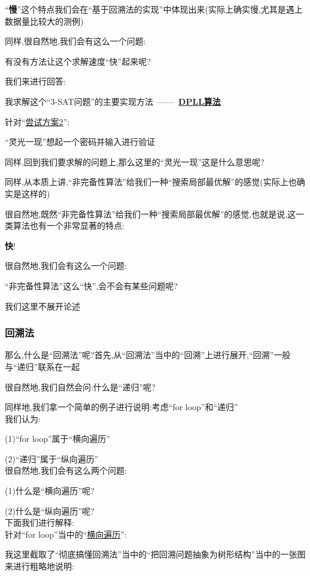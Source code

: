         \par
        ``\textbf{慢}''这个特点我们会在``基于回溯法的实现''中体现出来(实际上确实慢,尤其是遇上数据量比较大的测例)\par
        同样,很自然地,我们会有这么一个问题:\\
        \begin{center}
            有没有方法让这个求解速度``快''起来呢?
        \end{center}
        我们来进行回答:\\
        \begin{center}
            我求解这个``3-SAT问题''的主要实现方法\ ——\ \underline{\textbf{DPLL算法}}
        \end{center}
        针对``\underline{尝试方案2}'':\par
            ``灵光一现''想起一个密码并输入进行验证\par
            同样,回到我们要求解的问题上,那么这里的``灵光一现''这是什么意思呢?\par
            同样,从本质上讲,``非完备性算法''给我们一种``搜索局部最优解''的感觉(实际上也确实是这样的)\par
            很自然地,既然``非完备性算法''给我们一种``搜索局部最优解''的感觉,也就是说,这一类算法也有一个非常显著的特点:\\
        \begin{center}
            \textbf{快}!
        \end{center}
        \par
        很自然地,我们会有这么一个问题:\\
        \begin{center}
            ``非完备性算法''这么``快'',会不会有某些问题呢?
        \end{center}
        \par
        我们这里不展开论述
        \subsubsection{回溯法}
        那么,什么是``回溯法''呢?首先,从``回溯法''当中的``回溯''上进行展开,``回溯''一般与``递归''联系在一起\par
            很自然地,我们自然会问:什么是``递归''呢?\par
        同样地,我们拿一个简单的例子进行说明:考虑``for loop''和``递归''\\
        我们认为:\par
            (1)``for loop''属于``横向遍历''\par
            (2)``递归''属于``纵向遍历''\\
        很自然地,我们会有这么两个问题:\par
            (1)什么是``横向遍历''呢?\par
            (2)什么是``纵向遍历''呢?\\
        下面我们进行解释:\\
        针对``for loop''当中的``\underline{横向遍历}'':\par
            我这里截取了``彻底搞懂回溯法''当中的``把回溯问题抽象为树形结构''当中的一张图来进行粗略地说明:


